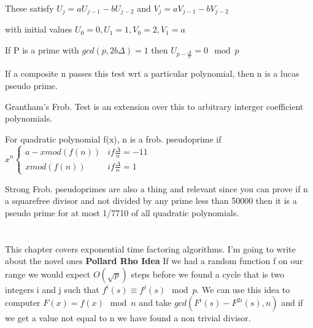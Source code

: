 \documentclass{article}
\begin{document}
These satisfy
$U_j = a U_{j-1} - b U_{j-2}$ and $V_j = aV_{j-1} - bV_{j-2}$

with initial values $U_0 = 0, U_1 = 1, V_0 = 2, V_1 = a$ 

If P is a prime with $gcd(p, 2b\Delta)= 1$ then $U_{p - \frac{\Delta}{p}} = 0 \mod p$

If a composite n passes this test wrt a particular polynomial, then n is a lucas pseudo prime.

Grantham's Frob. Test is an extension over this to arbitrary interger coefficient polynomials. 

For quadratic polynomial f(x), n is a frob. pseudoprime if 
$x^n \begin{cases}
a-x mod(f(n)) &if \frac{\Delta}{n} = -11 \\
x mod (f(n)) &if \frac{\Delta}{n} = 1
\end{cases}$


Strong Frob. pseudoprimes are also a thing and relevant since you can prove if n a squarefree divisor and not divided by any prime less than 50000 then it is a pseudo prime for at most 1/7710 of all quadratic polynomials.









\section{}


\section{}

This chapter covers exponential time factoring algorithms. I'm going to write about the novel ones
\textbf{Pollard Rho Idea} 
If we had a random function f on our range we would expect $O(\sqrt{p})$ steps before we found a cycle that is two integers i and j such that $f^i ( s ) \equiv f^j (s ) \mod p$. We can use this idea to computer $F(x ) = f(x ) \mod n$ and take $gcd ( F^i (s) - F^{2i} (s ), n ) $ and if we get a value not equal to n we have found a non trivial divisor.
\end{document}

